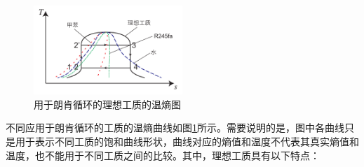\begin{figure}[!ht]
\centering 
\includegraphics[width=0.5\textwidth]{fig/idealTs}
\caption{用于朗肯循环的理想工质的温熵图}
\label{fig:idealTs}
\end{figure}

不同应用于朗肯循环的工质的温熵曲线如图\ref{fig:idealTs}所示。需要说明的是，图中各曲线只是用于表示不同工质的饱和曲线形状，曲线对应的熵值和温度不代表其真实熵值和温度，也不能用于不同工质之间的比较。其中，理想工质具有以下特点\cite{Abbin1977}：

